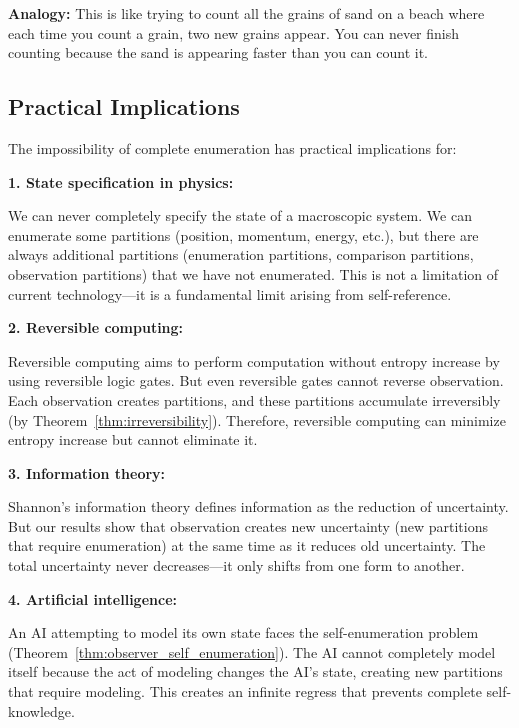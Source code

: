\documentclass[twocolumn,10pt]{article}
\theoremstyle{definition}
\theoremstyle{remark}
\begin{document}
\noindent\textbf{Analogy:} This is like trying to count all the grains of sand on a beach where each time you count a grain, two new grains appear. You can never finish counting because the sand is appearing faster than you can count it.

\subsection{Practical Implications}

The impossibility of complete enumeration has practical implications for:

\vspace{0.2cm}
\noindent\textbf{1. State specification in physics:}

We can never completely specify the state of a macroscopic system. We can enumerate some partitions (position, momentum, energy, etc.), but there are always additional partitions (enumeration partitions, comparison partitions, observation partitions) that we have not enumerated. This is not a limitation of current technology—it is a fundamental limit arising from self-reference.

\vspace{0.2cm}
\noindent\textbf{2. Reversible computing:}

Reversible computing\cite{bennett1973} aims to perform computation without entropy increase by using reversible logic gates. But even reversible gates cannot reverse observation. Each observation creates partitions, and these partitions accumulate irreversibly (by Theorem~\ref{thm:irreversibility}). Therefore, reversible computing can minimize entropy increase but cannot eliminate it.

\vspace{0.2cm}
\noindent\textbf{3. Information theory:}

Shannon's information theory\cite{shannon1948} defines information as the reduction of uncertainty. But our results show that observation creates new uncertainty (new partitions that require enumeration) at the same time as it reduces old uncertainty. The total uncertainty never decreases—it only shifts from one form to another.

\vspace{0.2cm}
\noindent\textbf{4. Artificial intelligence:}

An AI attempting to model its own state faces the self-enumeration problem (Theorem~\ref{thm:observer_self_enumeration}). The AI cannot completely model itself because the act of modeling changes the AI's state, creating new partitions that require modeling. This creates an infinite regress that prevents complete self-knowledge.
\end{document}
